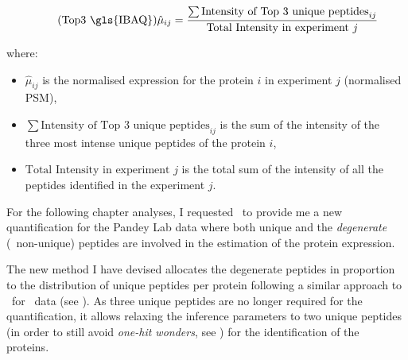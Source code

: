 \begin{minipage}{\textwidth}
\begin{equation}
    \tag{Top3 \gls{IBAQ}}\label{eq:Top3}
    \hat{\mu}_{ij}=\frac{\sum \text{Intensity of Top 3 unique peptides} _{ij}}{\text{Total Intensity in experiment } j}
    \raisetag{3\normalbaselineskip}
\end{equation}

where:{\small
\begin{itemize}[topsep=0pt,nosep]
    \item $\hat{\mu}_{ij}$ is the normalised expression for the protein $i$ in experiment $j$ (normalised \gls{PSM}),
    \item $\sum \text{Intensity of Top 3 unique peptides} _{ij}$ is
        the sum of the intensity of the three most intense unique peptides
        of the protein $i$,
    \item $\text{Total Intensity in experiment } j$ is the total sum of the intensity of all
the peptides identified in the experiment $j$.
\end{itemize}
}
\end{minipage}

For the following chapter analyses,
I requested \james\ to provide me a new quantification for the Pandey Lab data
where both unique and
the \emph{degenerate} (\ie\ non-unique) peptides
are involved in the estimation of the protein expression.\mybr\

The new method I have devised allocates the degenerate peptides
in proportion to the distribution of unique peptides per protein
following a similar approach to \cuffl\ for \Rnaseq\ data (see ).
As three unique peptides are no longer required for the quantification,
it allows relaxing the inference parameters to two unique peptides
(in order to still avoid \emph{one-hit wonders}, see )
for the identification of the proteins.\mybr\


\mybr\


\cbstart{}

